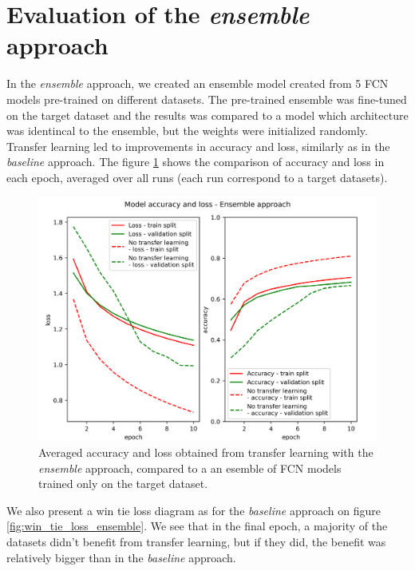 \documentclass[a4paper,11pt,twoside]{report}
\theoremstyle{definition}
\begin{document}
\FloatBarrier
\section{Evaluation of the \textit{ensemble} approach}
In the \textit{ensemble} approach, we created an ensemble model created from 5 FCN models pre-trained on different datasets. The pre-trained ensemble was fine-tuned on the target dataset and the results was compared to a model which architecture was identincal to the ensemble, but the weights were initialized randomly. Transfer learning led to improvements in accuracy and loss, similarly as in the \textit{baseline} approach. The figure \ref{fig:ensemble_acc} shows the comparison of accuracy and loss in each epoch, averaged over all runs (each run correspond to a target datasets).

\FloatBarrier

\begin{figure}[h!t]
\centering
\includegraphics[width=17 cm]{imgs/ensemble/loss_acc.png}
\caption{Averaged accuracy and loss obtained from transfer learning with the \textit{ensemble} approach, compared to a an esemble of FCN models trained only on the target dataset.}
\label{fig:ensemble_acc}
\end{figure}
\FloatBarrier
We also present a win tie loss diagram as for the \textit{baseline} approach on figure \ref{fig:win_tie_loss_ensemble}. We see that in the final epoch, a majority of the datasets didn't benefit from transfer learning, but if they did, the benefit was relatively bigger than in the \textit{baseline} approach.
\end{document}
